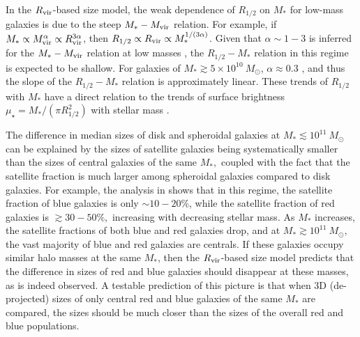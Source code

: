 \documentclass[usenatbib,usegraphicx,letterpaper]{mn2e}
\newcommand{\rhalf}{R_{1/2}}
\newcommand{\mstar}{M_{\ast}}
\newcommand{\mvir}{M_{\rm vir}}
\newcommand{\rvir}{R_{\rm vir}}
\begin{document}
In the $\rvir$-based size model, the weak dependence of $\rhalf$ on $\mstar$ for low-mass galaxies is due to the steep $\mstar-\mvir$ relation. For example, if $\mstar\propto\mvir^\alpha\propto\rvir^{3\alpha}$, then $\rhalf\propto \rvir\propto \mstar^{1/(3\alpha)}$. Given that $\alpha\sim 1-3$ is inferred for the $\mstar-\mvir$ relation at low masses \citep{kravtsov10,moster_etal13,behroozi13_smhm,kravtsov_etal14}, the $\rhalf-\mstar$ relation in this regime is expected to be shallow.
For galaxies of $\mstar\gtrsim 5\times 10^{10}\ M_\odot$, $\alpha\approx 0.3$ \citep[e.g.,][]{kravtsov_etal14}, and thus
the slope of the $\rhalf-\mstar$ relation is approximately linear. These trends of $\rhalf$ with $\mstar$ have a direct relation to the trends of surface brightness $\mu_\star=\mstar/(\pi\rhalf^2)$ with stellar mass \citep[see, for example, the $\mu_\star-$dependent clustering measurements in][which are qualitatively similar to the measurements reported here]{li_etal06}.

The difference in median sizes of disk and spheroidal galaxies at $\mstar\lesssim 10^{11}\ M_\odot$ can be explained by the sizes of satellite galaxies being systematically smaller than the sizes of central galaxies of the same $\mstar,$ coupled with the fact that the satellite fraction is much larger among spheroidal galaxies compared to disk galaxies. For example, the analysis in \citet{rodriguez_puebla_etal15} shows that in this regime, the satellite fraction of blue galaxies is only $\sim10-20\%$, while
the satellite fraction of red galaxies is $\gtrsim 30-50\%,$ increasing with decreasing stellar mass.
As $\mstar$ increases, the satellite fractions of both blue and red galaxies drop, and at $\mstar\gtrsim 10^{11}\ M_\odot,$ the vast majority of blue and red galaxies are centrals. If these galaxies occupy similar halo masses at the same $\mstar$, then the $\rvir$-based size model predicts that the difference in sizes of red and blue galaxies should disappear at these masses, as is indeed observed. A testable prediction of this picture is that when 3D (de-projected) sizes of only central red and blue galaxies of the same $\mstar$ are compared, the sizes should be much closer than the sizes of the overall red and blue populations.
\end{document}
